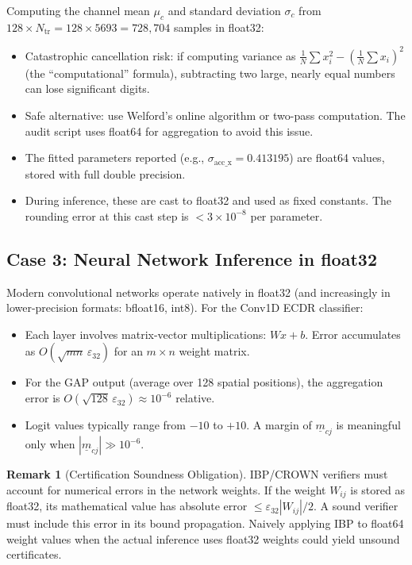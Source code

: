 \documentclass[11pt, a4paper]{article}
\theoremstyle{definition}
\newtheorem{remark}{Remark}[section]
\theoremstyle{plain}
\newcommand{\eps}{\varepsilon}
\begin{document}
Computing the channel mean $\mu_c$ and standard deviation $\sigma_c$ from
$128 \times N_{\text{tr}} = 128 \times 5693 = 728,704$ samples in float32:
\begin{itemize}[leftmargin=1.5em]
  \item Catastrophic cancellation risk: if computing variance as
        $\frac{1}{N}\sum x_i^2 - \left(\frac{1}{N}\sum x_i\right)^2$
        (the ``computational'' formula), subtracting two large, nearly equal
        numbers can lose significant digits.
  \item Safe alternative: use Welford's online algorithm or two-pass computation.
        The audit script uses float64 for aggregation to avoid this issue.
  \item The fitted parameters reported (e.g., $\sigma_{\text{acc\_x}} = 0.413195$)
        are float64 values, stored with full double precision.
  \item During inference, these are cast to float32 and used as fixed constants.
        The rounding error at this cast step is $< 3 \times 10^{-8}$ per parameter.
\end{itemize}

\subsection{Case 3: Neural Network Inference in float32}

Modern convolutional networks operate natively in float32 (and increasingly in
lower-precision formats: bfloat16, int8). For the Conv1D ECDR classifier:
\begin{itemize}[leftmargin=1.5em]
  \item Each layer involves matrix-vector multiplications: $W x + b$.
        Error accumulates as $O(\sqrt{mn}\,\eps_{32})$ for an $m \times n$ weight matrix.
  \item For the GAP output (average over 128 spatial positions), the aggregation
        error is $O(\sqrt{128}\,\eps_{32}) \approx 10^{-6}$ relative.
  \item Logit values typically range from $-10$ to $+10$. A margin of $\underline{m}_{cj}$
        is meaningful only when $|\underline{m}_{cj}| \gg 10^{-6}$.
\end{itemize}

\begin{remark}[Certification Soundness Obligation]
  IBP/CROWN verifiers must account for numerical errors in the network weights.
  If the weight $W_{ij}$ is stored as float32, its mathematical value has absolute
  error $\le \eps_{32}|W_{ij}|/2$. A sound verifier must include this error in its
  bound propagation. Naively applying IBP to float64 weight values when the actual
  inference uses float32 weights could yield unsound certificates.
\end{remark}
\end{document}
